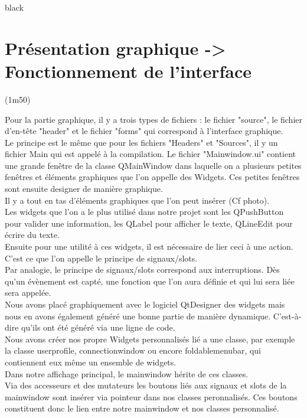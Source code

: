 {\begin{items}{black}{\Bullet}
\newpage
\section{Présentation graphique -> Fonctionnement de l'interface} (1m50)

Pour la partie graphique, il y a trois types de fichiers : le fichier "source", le fichier d'en-tête "header" et le fichier "forms" qui correspond à l'interface graphique.\\

Le principe est le même que pour les fichiers "Headers" et "Sources", il y un fichier Main qui est appelé à la compilation. Le fichier "Mainwindow.ui" contient une grande fenêtre de la classe QMainWindow dans laquelle on a plusieurs petites fenêtres et éléments graphiques que l'on appelle des Widgets. Ces petites fenêtres sont ensuite designer de manière graphique. \\
Il y a tout en tas d'éléments graphiques que l'on peut insérer (Cf photo).\\
Les widgets que l'on a le plus utilisé dans notre projet sont les QPushButton pour valider une information, les QLabel pour afficher le texte, QLineEdit pour écrire du texte.\\

Ensuite pour une utilité à ces widgets, il est nécessaire de lier ceci à une action. C'est ce que l'on appelle le principe de signaux/slots.\\
Par analogie, le principe de signaux/slots correspond aux interruptions. Dès qu'un évènement est capté, une fonction que l'on aura définie et qui lui sera liée sera appelée.\\

Nous avons placé graphiquement avec le logiciel QtDesigner des widgets mais nous en avons également généré une bonne partie de manière dynamique. C'est-à-dire qu'ils ont été généré via une ligne de code.\\

Nous avons créer nos propre Widgets personnalisés lié a une classe, par exemple la classe userprofile, connectionwindow ou encore foldablemenubar, qui contiennent eux même un ensemble de widgets.\\
Dans notre affichage principal, le mainwindow hérite de ces classes.\\ 
Via des accesseurs et des mutateurs les boutons liés aux signaux et slots de la mainwindow sont insérer via pointeur dans nos classes peronnalisés. Ces boutons constituent donc le lien entre notre mainwindow et nos classes personnalisé.\\




\end{items}}
